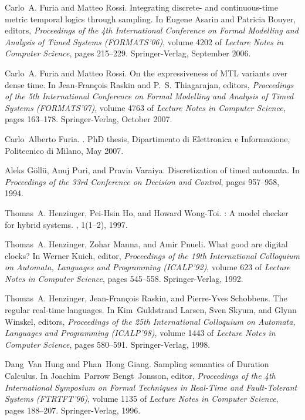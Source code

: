 \documentclass[a4paper]{article}
\theoremstyle{plain}
\theoremstyle{definition}
\begin{document}
\begin{thebibliography}{10}
Carlo~A. Furia and Matteo Rossi.
\newblock Integrating discrete- and continuous-time metric temporal logics
  through sampling.
\newblock In Eugene Asarin and Patricia Bouyer, editors, {\em Proceedings of
  the 4th International Conference on Formal Modelling and Analysis of Timed
  Systems (FORMATS'06)}, volume 4202 of {\em Lecture Notes in Computer
  Science}, pages 215--229. Springer-Verlag, September 2006.

Carlo~A. Furia and Matteo Rossi.
\newblock On the expressiveness of {MTL} variants over dense time.
\newblock In Jean-Fran{\c c}ois Raskin and P.~S. Thiagarajan, editors, {\em
  Proceedings of the 5th International Conference on Formal Modelling and
  Analysis of Timed Systems (FORMATS'07)}, volume 4763 of {\em Lecture Notes in
  Computer Science}, pages 163--178. Springer-Verlag, October 2007.

Carlo~Alberto Furia.
.
\newblock PhD thesis, Dipartimento di Elettronica e Informazione, Politecnico
  di Milano, May 2007.

Aleks G{\" o}ll{\" u}, Anuj Puri, and Pravin Varaiya.
\newblock Discretization of timed automata.
\newblock In {\em Proceedings of the 33rd Conference on Decision and Control},
  pages 957--958, 1994.

Thomas~A. Henzinger, Pei-Hsin Ho, and Howard Wong-Toi.
: A model checker for hybrid systems.
, 1(1--2), 1997.

Thomas~A. Henzinger, Zohar Manna, and Amir Pnueli.
\newblock What good are digital clocks?
\newblock In Werner Kuich, editor, {\em Proceedings of the 19th International
  Colloquium on Automata, Languages and Programming (ICALP'92)}, volume 623 of
  {\em Lecture Notes in Computer Science}, pages 545--558. Springer-Verlag,
  1992.

Thomas~A. Henzinger, Jean-Fran{\c c}ois Raskin, and Pierre-Yves Schobbens.
\newblock The regular real-time languages.
\newblock In Kim~Guldstrand Larsen, Sven Skyum, and Glynn Winskel, editors,
  {\em Proceedings of the 25th International Colloquium on Automata, Languages
  and Programming (ICALP'98)}, volume 1443 of {\em Lecture Notes in Computer
  Science}, pages 580--591. Springer-Verlag, 1998.

Dang~Van Hung and Phan~Hong Giang.
\newblock Sampling semantics of {D}uration {C}alculus.
\newblock In Joachim~Parrow Bengt~Jonsson, editor, {\em Proceedings of the 4th
  International Symposium on Formal Techniques in Real-Time and Fault-Tolerant
  Systems (FTRTFT'96)}, volume 1135 of {\em Lecture Notes in Computer Science},
  pages 188--207. Springer-Verlag, 1996.


\end{thebibliography}
\end{document}
